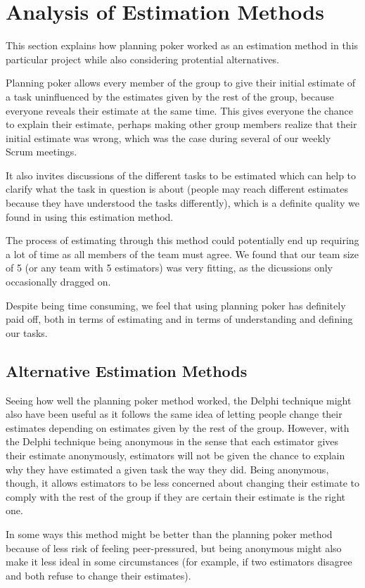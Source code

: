 \section{Analysis of Estimation Methods}
\label{sec:AnalysisEstimation}
This section explains how planning poker worked as an estimation method in this
particular project while also considering protential alternatives.

Planning poker allows every member of the group to give their initial estimate
of a task uninfluenced by the estimates given by the rest of the group, because
everyone reveals their estimate at the same time. This gives everyone the chance
to explain their estimate, perhaps making other group members realize that their
initial estimate was wrong, which was the case during several of our weekly Scrum
meetings.

It also invites discussions of the different tasks to be estimated which can
help to clarify what the task in question is about (people may reach different
estimates because they have understood the tasks differently), which is a
definite quality we found in using this estimation method.

The process of estimating through this method could potentially end up requiring
a lot of time as all members of the team must agree. We found that our team size
of 5 (or any team with 5 estimators) was very fitting, as the dicussions only
occasionally dragged on.

Despite being time consuming, we feel that using planning poker has definitely
paid off, both in terms of estimating and in terms of understanding and defining
our tasks.

\subsection{Alternative Estimation Methods}
Seeing how well the planning poker method worked, the Delphi
technique\cite{caye} might also have been useful as it follows the same idea of
letting people change their estimates depending on estimates given by the rest
of the group. However, with the Delphi technique being anonymous in the sense
that each estimator gives their estimate anonymously, estimators will not be
given the chance to explain why they have estimated a given task the way they
did. Being anonymous, though, it allows estimators to be less concerned about
changing their estimate to comply with the rest of the group if they are certain
their estimate is the right one.

In some ways this method might be better than the planning poker method because
of less risk of feeling peer-pressured, but being anonymous might also make it
less ideal in some circumstances (for example, if two estimators disagree and
both refuse to change their estimates).
